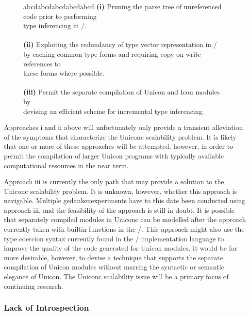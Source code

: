 \begin{figure}[h]
\begin{tabbing}
abcd\=abcd\=abcd\=abcd\=abcd \kill
\> {\bf (i)} Pruning the parse tree of unreferenced code prior to performing \\
\> type inferencing in \Ic/. \\
\\
\> {\bf (ii)} Exploiting the redundancy of type vector representation in \Ic/ \\
\> by caching common type forms and requiring copy-on-write references to \\
\> these forms where possible. \\
\\
\> {\bf (iii)} Permit the separate compilation of Unicon and Icon modules by \\
\> devising an efficient scheme for incremental type inferencing.
\end{tabbing}
\end{figure}
\noindent Approaches i and ii above will unfortunately only provide a transient
alleviation of the symptoms that characterize the Uniconc scalability problem.
It is likely that one or more of these approaches will be attempted, however,
in order to permit the compilation of larger Unicon programs with typically
available computational resources in the near term.  

Approach iii is currently the only path that may provide a solution to the
Uniconc scalability problem. It is unknown, however, whether this approach is
navigable. Multiple gedankenexperiments have to this date been conducted using
approach iii, and the feasibility of the approach is still in doubt. It is
possible that separately compiled modules in Uniconc can be modelled after the
approach currently taken with builtin functions in the \Rtl/. This approach
might also use the type coercion syntax currently found in the \Rtl/
implementation language to improve the quality of the code generated for
Unicon modules. It would be far more desirable, however, to devise a technique
that supports the separate compilation of Unicon modules without marring the
syntactic or semantic elegance of Unicon. The Uniconc scalability issue will be
a primary focus of continuing research.

\subsubsection{Lack of Introspection} 

